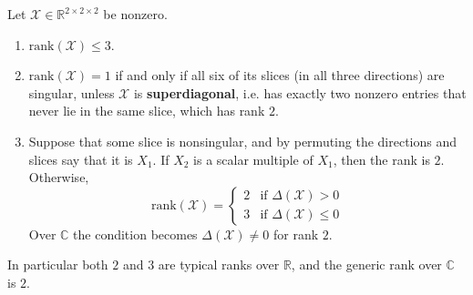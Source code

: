   \begin{theorem}
    \label{thm:222}
    Let $\mathcal{X} \in \mathbb{R}^{2 \times 2 \times 2}$ be nonzero.
    \begin{enumerate}
      \item $\mathrm{rank}(\mathcal{X}) \leq 3$.
      \item $\mathrm{rank}(\mathcal{X}) = 1$ if and only if all six of its slices (in all three directions) are singular, unless $\mathcal{X}$ is \textbf{superdiagonal}, i.e. has exactly two nonzero entries that never lie in the same slice, which has rank $2$.
      \item Suppose that some slice is nonsingular, and by permuting the directions and slices say that it is $X_1$. If $X_2$ is a scalar multiple of $X_1$, then the rank is $2$. Otherwise,
      \begin{equation}
        \mathrm{rank}(\mathcal{X}) = \begin{cases} 2 & \text{if } \Delta(\mathcal{X}) > 0 \\ 3 & \text{if } \Delta(\mathcal{X}) \leq 0 \end{cases}
      \end{equation}
      Over $\mathbb{C}$ the condition becomes $\Delta(\mathcal{X}) \neq 0$ for rank $2$.
    \end{enumerate}
    In particular both $2$ and $3$ are typical ranks over $\mathbb{R}$, and the generic rank over $\mathbb{C}$ is $2$.
  \end{theorem}
